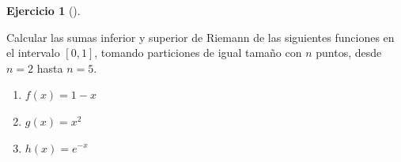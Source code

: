 \documentclass[
  spanish,
  a4paper,
]{scrreport}
\theoremstyle{definition}
\newtheorem{exercise}{Ejercicio}[chapter]
\theoremstyle{remark}
\begin{document}
\begin{exercise}[]\protect\hypertarget{exr-sumas-inferiores-superiores-riemann}{}\label{exr-sumas-inferiores-superiores-riemann}

Calcular las sumas inferior y superior de Riemann de las siguientes
funciones en el intervalo \([0,1]\), tomando particiones de igual tamaño
con \(n\) puntos, desde \(n=2\) hasta \(n=5\).

\begin{enumerate}
\def\labelenumi{\alph{enumi}.}
\item
  \(f(x) = 1-x\)
\item
  \(g(x) = x^2\)
\item
  \(h(x) = e^{-x}\)
\end{enumerate}

\end{exercise}
\end{document}
